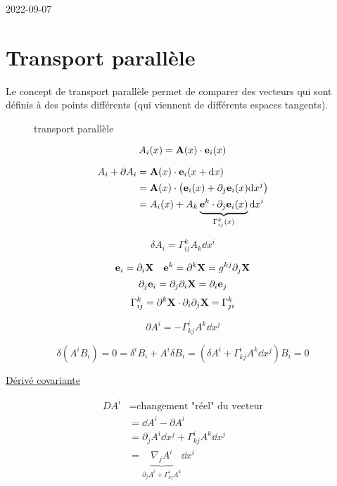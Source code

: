 


2022-09-07

\section*{Transport parallèle}

Le concept de transport parallèle permet de comparer des vecteurs qui sont définis à des points différents (qui viennent de différents espaces tangents). 

\begin{figure}[ht]
    \centering
    \caption{transport parallèle}
    \label{fig:transport-parallèle}
\end{figure}

$$A_i (x) = \vb{A}(x)\cdot \vb{e}_i(x)$$ 

\begin{align*}
	A_i + \partial A_i &= \vb{A}(x)\cdot \vb{e}_i (x+ \dd  x) \\
										 &= \vb{A}(x)\cdot \left( \vb{e}_i (x) + \partial_j \vb{e}_i (x) \dd  x^{j} \right) \\ &= A_i (x) + A_k \underbrace{\vb{e}^k\cdot \partial_j \vb{e}_i (x)}_{\Gamma_{ij}^{k}(x)} \dd  x^i  
\end{align*}

$$\boxed{\delta A_i = \Gamma_{ij}^{k} A_k \dd x^{i}}$$

$$\vb{e}_i = \partial_i \vb{X} \quad \vb{e}^k = \partial^{k}\vb{X} = g^{kj}\partial_j \vb{X}$$ 
$$\partial_j \vb{e}_i = \partial_j \partial_i \vb{X}= \partial_i \vb{e}_j$$ 
$$\Gamma_{ij}^{k}= \partial^{k}\vb{X}\cdot \partial_i \partial_j \vb{X} = \Gamma_{ji}^k$$ 

$$\boxed{\partial A^{i}= - \Gamma_{kj}^{i} A^{k} \dd x^{j}}$$ 

$$\delta (A^{i}B_i ) =0 = \delta^{i}B_i +A^{i}\delta B_i = \left( \delta A^{i}+ \Gamma_{kj}^{i}A^{k} \dd x^j \right)B_i = 0$$ 


\underline{Dérivé covariante} 


\begin{align*}
    DA^{i} &= \text{changement "réel" du vecteur} \\ &= \dd A^{i}- \partial A^{i}\\ &= \partial_j A^{i} \dd x^{j}+ \Gamma_{kj}^{i}A^{k} \dd x^{j} \\ &= \underbrace{\nabla_j A^{i}}_{\partial_j A^{i}+ \Gamma_{kj}^{i}A^{k}}  \dd x^i 
\end{align*}

